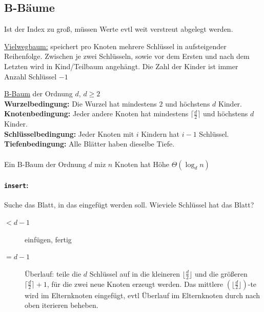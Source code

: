 \documentclass{scrartcl}
\begin{document}
{\Huge {}}

\subsection{B-Bäume}
Ist der Index zu groß, müssen Werte evtl weit verstreut abgelegt werden. \\

\begin{shaded}
\underline{Vielwegbaum:} speichert pro Knoten mehrere Schlüssel in aufsteigender Reihenfolge. Zwischen je zwei Schlüsseln, sowie vor dem Ersten und nach dem Letzten wird in Kind/Teilbaum angehängt. Die Zahl der Kinder ist immer Anzahl Schlüssel $-1$

\underline{B-Baum} der Ordnung $d$, $d\geq 2$ \\
\textbf{Wurzelbedingung:} Die Wurzel hat mindestens $2$ und höchstens $d$ Kinder. \\
\textbf{Knotenbedingung:} Jeder andere Knoten hat mindestens $\lceil \frac{d}{2}\rceil$ und höchstens $d$ Kinder. \\
\textbf{Schlüsselbedingung:} Jeder Knoten mit $i$ Kindern hat $i-1$ Schlüssel. \\
\textbf{Tiefenbedingung:} Alle Blätter haben dieselbe Tiefe. \\ \ \\
Ein B-Baum der Ordnung $d$ miz $n$ Knoten hat Höhe $\Theta(\log_d n)$
\end{shaded}

\paragraph{\texttt{insert}:} Suche das Blatt, in das eingefügt werden soll. Wieviele Schlüssel hat das Blatt?
\begin{description}
	\item[$<d-1$] einfügen, fertig
	\item[$=d-1$] Überlauf: teile die $d$ Schlüssel auf in die kleineren $\lfloor \frac{d}{2} \rfloor$ und die größeren $\lceil \frac{d}{2} \rceil+1$, für die zwei neue Knoten erzeugt werden. Das mittlere $(\lfloor \frac{d}{2} \rfloor)$-te wird im Elternknoten eingefügt, evtl Überlauf im Elternknoten durch nach oben iterieren beheben.
\end{description}
\end{document}
